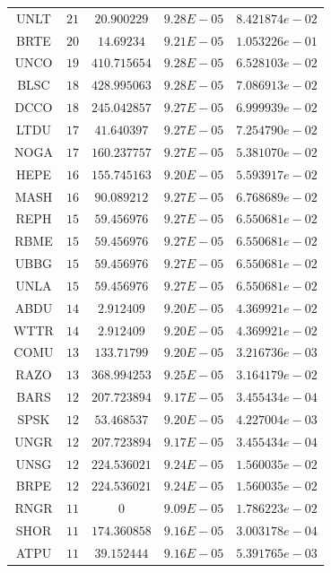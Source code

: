 \documentclass{statsoc}
\begin{document}
\begin{table}
{\begin{tabular}{*{5}{c}}
UNLT  &  $21$  &  $20.900229$  &  $9.28E-05$  &  $8.421874e-02$\\
BRTE  &  $20$  &  $14.69234$  &  $9.21E-05$  &  $1.053226e-01$\\
UNCO  &  $19$  &  $410.715654$  &  $9.28E-05$  &  $6.528103e-02$\\
BLSC  &  $18$  &  $428.995063$  &  $9.28E-05$  &  $7.086913e-02$\\
DCCO  &  $18$  &  $245.042857$  &  $9.27E-05$  &  $6.999939e-02$\\
LTDU  &  $17$  &  $41.640397$  &  $9.27E-05$  &  $7.254790e-02$\\
NOGA  &  $17$  &  $160.237757$  &  $9.27E-05$  &  $5.381070e-02$\\
HEPE  &  $16$  &  $155.745163$  &  $9.20E-05$  &  $5.593917e-02$\\
MASH  &  $16$  &  $90.089212$  &  $9.27E-05$  &  $6.768689e-02$\\
REPH  &  $15$  &  $59.456976$  &  $9.27E-05$  &  $6.550681e-02$\\
RBME  &  $15$  &  $59.456976$  &  $9.27E-05$  &  $6.550681e-02$\\
UBBG  &  $15$  &  $59.456976$  &  $9.27E-05$  &  $6.550681e-02$\\
UNLA  &  $15$  &  $59.456976$  &  $9.27E-05$  &  $6.550681e-02$\\
ABDU  &  $14$  &  $2.912409$  &  $9.20E-05$  &  $4.369921e-02$\\
WTTR  &  $14$  &  $2.912409$  &  $9.20E-05$  &  $4.369921e-02$\\
COMU  &  $13$  &  $133.71799$  &  $9.20E-05$  &  $3.216736e-03$\\
RAZO  &  $13$  &  $368.994253$  &  $9.25E-05$  &  $3.164179e-02$\\
BARS  &  $12$  &  $207.723894$  &  $9.17E-05$  &  $3.455434e-04$\\
SPSK  &  $12$  &  $53.468537$  &  $9.20E-05$  &  $4.227004e-03$\\
UNGR  &  $12$  &  $207.723894$  &  $9.17E-05$  &  $3.455434e-04$\\
UNSG  &  $12$  &  $224.536021$  &  $9.24E-05$  &  $1.560035e-02$\\
BRPE  &  $12$  &  $224.536021$  &  $9.24E-05$  &  $1.560035e-02$\\
RNGR  &  $11$  &  $0$  &  $9.09E-05$  &  $1.786223e-02$\\
SHOR  &  $11$  &  $174.360858$  &  $9.16E-05$  &  $3.003178e-04$\\
ATPU  &  $11$  &  $39.152444$  &  $9.16E-05$  &  $5.391765e-03$\\

\end{tabular}}
\end{table}
\end{document}
